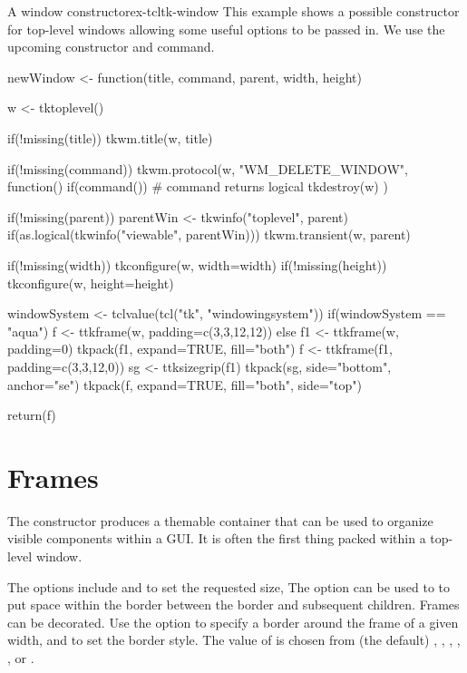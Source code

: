 \begin{example}{A window constructor}{ex-tcltk-window}
  This example shows a possible constructor for top-level windows
  allowing some useful options to be passed in. We use the upcoming
   constructor and  command.
\begin{Schunk}
\begin{Sinput}
 newWindow <- function(title, command, parent,
                       width, height) {
   w <- tktoplevel()
 
   if(!missing(title)) tkwm.title(w, title)
 
   if(!missing(command)) 
     tkwm.protocol(w, "WM_DELETE_WINDOW", function() {
       if(command())                     # command returns logical
         tkdestroy(w)
     })
 
   if(!missing(parent)) {
     parentWin <- tkwinfo("toplevel", parent)
     if(as.logical(tkwinfo("viewable", parentWin))) {
       tkwm.transient(w, parent)
     }
   }
   
   if(!missing(width)) tkconfigure(w, width=width)
   if(!missing(height)) tkconfigure(w, height=height)
 
   windowSystem <- tclvalue(tcl("tk", "windowingsystem"))
   if(windowSystem == "aqua") {
     f <- ttkframe(w, padding=c(3,3,12,12))
   } else {
     f1 <- ttkframe(w, padding=0)
     tkpack(f1, expand=TRUE, fill="both")
     f <- ttkframe(f1, padding=c(3,3,12,0))
     sg <- ttksizegrip(f1)
     tkpack(sg, side="bottom", anchor="se")
   }
   tkpack(f, expand=TRUE, fill="both", side="top")
 
   return(f)
 }
\end{Sinput}
\end{Schunk}
\end{example}

\section{Frames}
\label{sec:tcltk:frames}

The  constructor produces a themable container
that can be used to organize visible components within a GUI. It is
often the first thing packed within a top-level window. 

The options include  and
 to set the requested size,
The 
option can be used to to put space within the border between the
border and subsequent children. Frames can be decorated. Use the
option  to specify a border around the frame of
a given width, and  to set the border
style. The value of  is chosen from (the default)
, , , ,
, or .  

